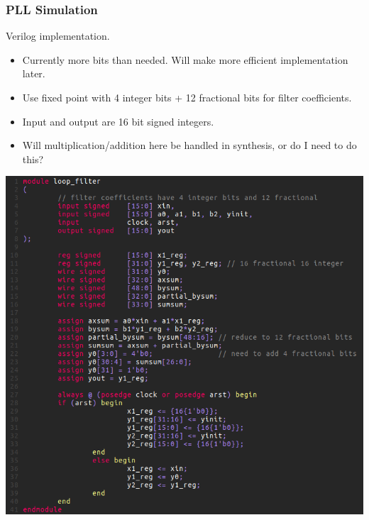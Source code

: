 \documentclass[t, screen, aspectratio=43]{beamer}
\begin{document}
\begin{frame}
	\frametitle{PLL Simulation}
	\begin{block}{Verilog implementation.}
	\begin{minipage}{5cm}
		\begin{itemize}
			\scriptsize
			\item Currently more bits than needed. Will make more efficient implementation later.
			\item Use fixed point with 4 integer bits + 12 fractional bits for filter coefficients.
			\item Input and output are 16 bit signed integers.
			\item Will multiplication/addition here be handled in synthesis, or do I need to do this?
		\end{itemize} 	
	\end{minipage}
	\begin{minipage}{6cm}
		\vspace{1em}
		\hspace{1em}\includegraphics[width=1\textwidth, angle=0]{verilog_module.png}
	\end{minipage}
	\end{block}
\end{frame}
\end{document}
